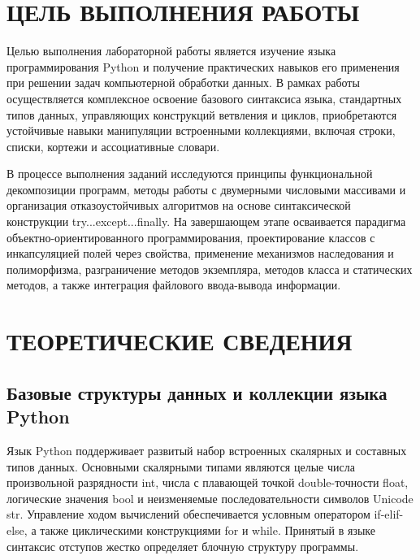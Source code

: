 \documentclass[14pt,a4paper]{extarticle}
\begin{document}
\newpage
\setcounter{page}{2}

\section{ЦЕЛЬ ВЫПОЛНЕНИЯ РАБОТЫ}

Целью выполнения лабораторной работы является изучение языка программирования Python и получение практических навыков его применения при решении задач компьютерной обработки данных. В рамках работы осуществляется комплексное освоение базового синтаксиса языка, стандартных типов данных, управляющих конструкций ветвления и циклов, приобретаются устойчивые навыки манипуляции встроенными коллекциями, включая строки, списки, кортежи и ассоциативные словари.

В процессе выполнения заданий исследуются принципы функциональной декомпозиции программ, методы работы с двумерными числовыми массивами и организация отказоустойчивых алгоритмов на основе синтаксической конструкции try...except...finally. На завершающем этапе осваивается парадигма объектно-ориентированного программирования, проектирование классов с инкапсуляцией полей через свойства, применение механизмов наследования и полиморфизма, разграничение методов экземпляра, методов класса и статических методов, а также интеграция файлового ввода-вывода информации.

\section{ТЕОРЕТИЧЕСКИЕ СВЕДЕНИЯ}

\subsection{Базовые структуры данных и коллекции языка Python}

Язык Python поддерживает развитый набор встроенных скалярных и составных типов данных. Основными скалярными типами являются целые числа произвольной разрядности int, числа с плавающей точкой double-точности float, логические значения bool и неизменяемые последовательности символов Unicode str. Управление ходом вычислений обеспечивается условным оператором if-elif-else, а также циклическими конструкциями for и while. Принятый в языке синтаксис отступов жестко определяет блочную структуру программы.
\end{document}
